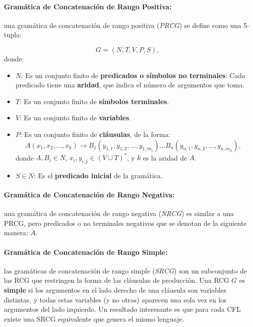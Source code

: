 \documentclass{article}
\begin{document}
\paragraph{Gramática de Concatenación de Rango Positiva:} una gramática de concatenación de rango positiva (\textit{PRCG}) se define como una 5-tupla:

\[
      G = (N, T, V, P, S),
\]
donde:

\begin{itemize}
      \item $N$: Es un conjunto finito de \textbf{predicados o símbolos no terminales}: Cada predicado tiene una \textbf{aridad}, que indica el número de argumentos que toma.
      \item $T$: Es un conjunto finito de \textbf{símbolos terminales}.
      \item $V$: Es un conjunto finito de \textbf{variables}.
      \item $P$: Es un conjunto finito de \textbf{cláusulas}, de la forma:
            \[
                  A(x_1, x_2, \ldots, x_k) \to B_1(y_{1,1}, y_{1,2}, \ldots, y_{1,m_1}) \ldots B_n(y_{n,1}, y_{n,2}, \ldots, y_{n,m_n}),
            \]
            donde $A, B_i \in N$, $x_i, y_{i,j} \in (V \cup T)^*$, y $k$ es la aridad de $A$.
      \item $S \in N$: Es el \textbf{predicado inicial} de la gramática.
\end{itemize}

\paragraph{Gramática de Concatenación de Rango Negativa:} una gramática de concatenación de rango negativa (\textit{NRCG}) es similar a una PRCG, pero predicados o no terminales negativos que se denotan de la siguiente manera: $\overline{A}$.

\paragraph{Gramática de Concatenación de Rango Simple:} las gramáticas de concatenación de rango simple (\textit{SRCG}) son un subconjunto de las RCG que restringen la forma de las cláusulas de producción.
Una RCG $G$ es \textbf{simple} si los argumentos en el lado derecho de una cláusula son variables distintas, y todas estas variables (y no otras) aparecen una sola vez en los argumentos del lado izquierdo.
Un resultado interesante es que para cada CFL existe una SRCG equivalente que genera el mismo lenguaje.
\end{document}
